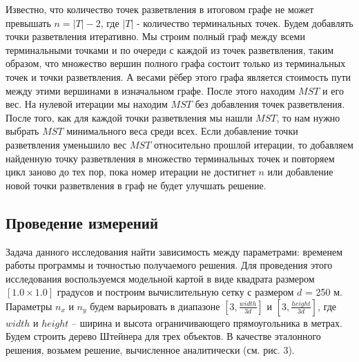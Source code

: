 Известно, что количество точек разветвления в итоговом графе не может превышать $n = |T| - 2$, где $|T|$ - количество терминальных точек. Будем добавлять точки разветвления итеративно. Мы строим полный граф между всеми терминальными точками и по очереди с каждой из точек разветвления, таким образом, что множество вершин полного графа состоит только из терминальных точек и точки разветвления. А весами рёбер этого графа является стоимость пути между этими вершинами в изначальном графе. После этого находим $MST$ и его вес. На нулевой итерации мы находим $MST$ без добавления точек разветвления. После того, как для каждой точки разветвления мы нашли $MST$, то нам нужно выбрать $MST$ минимального веса среди всех. Если добавление точки разветвления уменьшило вес $MST$ относительно прошлой итерации, то добавляем найденную точку разветвления в множество терминальных точек и повторяем цикл заново до тех пор, пока номер итерации не достигнет $n$ или добавление новой точки разветвления в граф не будет улучшать решение.\\
%	
%		
%		


\subsection*{\Large{Проведение измерений}}
Задача данного исследования найти зависимость между параметрами: временем работы программы и точностью получаемого решения. Для проведения этого исследования воспользуемся модельной картой в виде квадрата размером $[1.0 \times 1.0]$ градусов и построим вычислительную сетку с размером $d$ = 250 м. Параметры $n_x$  и $n_y$  будем варьировать в диапазоне $[3, \frac{width}{3d}]$ и $[3, \frac{height}{3d}]$, где $width$ и $height$ – ширина и высота ограничивающего прямоугольника в метрах. Будем строить дерево Штейнера для трех объектов. В качестве эталонного решения, возьмем решение, вычисленное аналитически (см. рис. 3).

